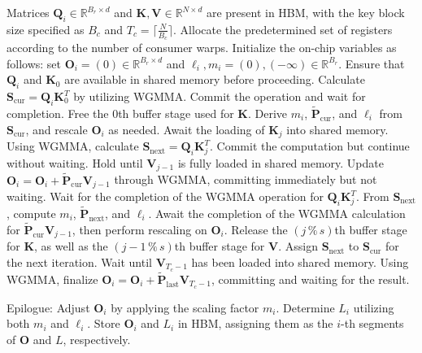 \begin{algorithm}[H]
    \caption{\small\label{alg:flash3_wgmma}\textsc{FlashAttention-3} consumer warpgroup forward pass}
    \begin{algorithmic}[1]
      \REQUIRE  Matrices $\mathbf{Q}_i \in \mathbb{R}^{B_r \times d}$ and $\mathbf{K}, \mathbf{V} \in \mathbb{R}^{N \times d}$ are present in HBM, with the key block size specified as $B_c$ and $T_c = \lceil \frac{N}{B_c} \rceil$.
      \STATE Allocate the predetermined set of registers according to the number of consumer warps.
      \STATE Initialize the on-chip variables as follows: set $\mathbf{O}_i = (0) \in \mathbb{R}^{B_r \times d}$ and $\ell_i, m_i = (0), (-\infty) \in \mathbb{R}^{B_r}$.
      \STATE Ensure that $\mathbf{Q}_i$ and $\mathbf{K}_0$ are available in shared memory before proceeding.
      \STATE Calculate $\mathbf{S}_{\mathrm{cur}} = \mathbf{Q}_i \mathbf{K}_0^T$ by utilizing WGMMA. Commit the operation and wait for completion.
      \STATE Free the $0$th buffer stage used for $\mathbf{K}$.
      \STATE Derive $m_{i}$, $\tilde{\mathbf{P}}_{\mathrm{cur}}$, and $\ell_{i}$ from $\mathbf{S}_{\mathrm{cur}}$, and rescale $\mathbf{O}_i$ as needed.
        \STATE Await the loading of $\mathbf{K}_j$ into shared memory.
        \label{code:mainloop_start}
        \STATE Using WGMMA, calculate $\mathbf{S}_{\mathrm{next}} = \mathbf{Q}_i \mathbf{K}_{j}^T$. Commit the computation but continue without waiting. \label{code:first_wgmma}
        \STATE Hold until $\mathbf{V}_{j-1}$ is fully loaded in shared memory.
        \STATE Update $\mathbf{O}_{i} = \mathbf{O}_{i} + \tilde{\mathbf{P}}_{\mathrm{cur}} \mathbf{V}_{j-1}$ through WGMMA, committing immediately but not waiting. \label{code:second_wgmma}
        \STATE Wait for the completion of the WGMMA operation for $\mathbf{Q}_i \mathbf{K}_{j}^T$.
        \STATE From $\mathbf{S}_{\mathrm{next}}$, compute $m_{i}$, $\tilde{\mathbf{P}}_{\mathrm{next}}$, and $\ell_{i}$. \label{code:softmax}
        \STATE Await the completion of the WGMMA calculation for $\tilde{\mathbf{P}}_{\mathrm{cur}} \mathbf{V}_{j-1}$, then perform rescaling on $\mathbf{O}_i$.
        \STATE Release the $(j\,\%\,s)$th buffer stage for $\mathbf{K}$, as well as the $(j-1\,\%\,s)$th buffer stage for $\mathbf{V}$.
        \STATE Assign $\mathbf{S}_{\mathrm{next}}$ to $\mathbf{S}_{\mathrm{cur}}$ for the next iteration.
        \label{code:mainloop_end}
      \ENDFOR \STATE Wait until $\mathbf{V}_{T_c - 1}$ has been loaded into shared memory.
      \STATE Using WGMMA, finalize $\mathbf{O}_{i} = \mathbf{O}_{i} + \tilde{\mathbf{P}}_{\mathrm{last}} \mathbf{V}_{T_c - 1}$, committing and waiting for the result.

\STATE Epilogue: Adjust $\mathbf{O}_{i}$ by applying the scaling factor $m_{i}$. Determine $L_{i}$ utilizing both $m_{i}$ and $\ell_{i}$.
Store $\mathbf{O}_{i}$ and $L_{i}$ in HBM, assigning them as the $i$-th segments of $\mathbf{O}$ and $L$, respectively.
\end{algorithmic}
\end{algorithm}

